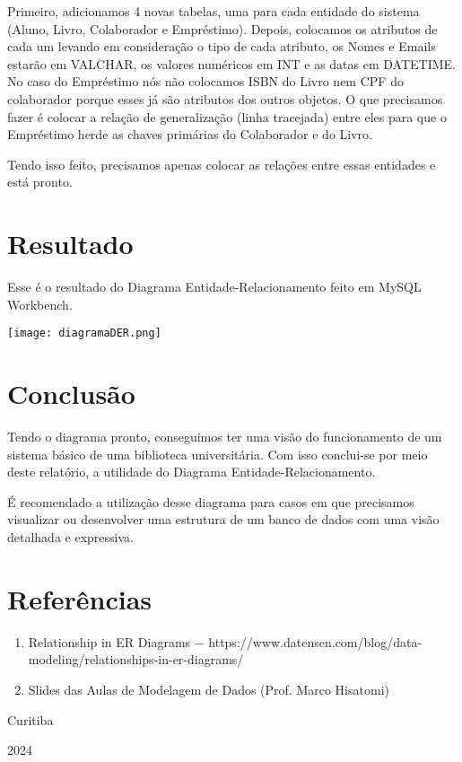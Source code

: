 \documentclass{report}
\begin{document}
Primeiro, adicionamos 4 novas tabelas, uma para cada entidade do sistema (Aluno, Livro, Colaborador e Empréstimo).
Depois, colocamos os atributos de cada um levando em consideração
o tipo de cada atributo, os Nomes e Emails estarão em VALCHAR, os valores numéricos em INT
e as datas em DATETIME.
No caso do Empréstimo nós não colocamos ISBN do Livro nem
CPF do colaborador porque esses já são atributos dos outros objetos. 
O que precisamos fazer é colocar a relação de generalização (linha tracejada) 
entre eles para que o Empréstimo herde as chaves primárias do 
Colaborador e do Livro.

Tendo isso feito, precisamos apenas colocar as relações entre essas
entidades e está pronto.

\indent
\section{Resultado}
Esse é o resultado do Diagrama Entidade-Relacionamento feito em MySQL
Workbench.

\begin{center}
    \texttt{[image: diagramaDER.png]}
\end{center}

\newpage
\thispagestyle{headings}

\indent
\section{Conclusão}
Tendo o diagrama pronto, conseguimos ter uma visão do funcionamento de um sistema
básico de uma biblioteca universitária. Com isso conclui-se por meio deste relatório,
a utilidade do Diagrama Entidade-Relacionamento. 

É recomendado a utilização desse diagrama para casos em que 
precisamos visualizar ou desenvolver uma estrutura de um 
banco de dados com uma visão detalhada e expressiva.

\indent
\section{Referências}

\begin{enumerate}
    \item Relationship in ER Diagrams $-$ https://www.datensen.com/blog/data-modeling/relationships-in-er-diagrams/
    \item Slides das Aulas de Modelagem de Dados (Prof. Marco Hisatomi)
\end{enumerate}

\vfill
\begin{center}
    Curitiba

    2024
\end{center}
\end{document}
